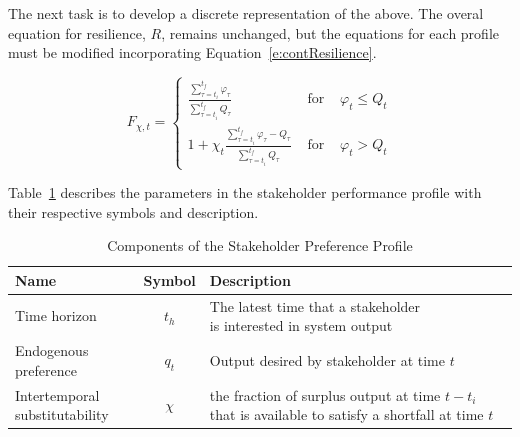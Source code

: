 \documentclass[preprint,12pt]{elsarticle}
\begin{document}
The next task is to develop a discrete representation of the
above. The overal equation for resilience, $R$, remains unchanged, but
the equations for each profile must be modified incorporating
Equation~\ref{e:contResilience}.

\begin{equation}
% 
% 
  \label{e:RPD}
  F_{\chi,t} = \left\{\begin{array}{lcr}
    \frac{\displaystyle\sum_{\tau=t_{i}}^{t_f}\varphi_{\tau}}{\displaystyle\sum_{\tau=t_i}^{t_f}Q_{\tau}}
    & \text{ for } &
    \varphi_{t} \leq Q_t \\
      1 + \chi_t
      \frac{\displaystyle\sum_{\tau = t_i}^{t_f}\varphi_{\tau}-Q_{\tau}}{\displaystyle\sum_{\tau = t_i}^{t_f}Q_{\tau}}
      & \text{ for } &
      \varphi_{t} > Q_{t}
  \end{array}\right.
\end{equation}




Table~\ref{t:StakeParameters} describes the parameters in the
stakeholder performance profile with their respective symbols and
description.

\begin{table}[h]
  \centering
  \begin{tabular}{l c l}
    \hline
    \hline
    \textbf{Name} & \textbf{Symbol} & \textbf{Description} \\
    \hline
    Time horizon &
    $t_h$ &
    \makecell[l]{The latest time that a stakeholder \\
              is interested in system output} \\
    Endogenous preference &
    $q_t$ &
    \makecell[l]{Output desired by stakeholder\\
              at time $t$} \\
    \makecell[l]{Intertemporal\\substitutability} &
    $\chi$ &
    \makecell[l]{the fraction of surplus output \\
              at time $t-t_i$ that is available \\
              to satisfy a shortfall at time $t$}\\
    \hline
  \end{tabular}
  \caption{Components of the Stakeholder Preference Profile}
  \label{t:StakeParameters}
\end{table}
\end{document}
